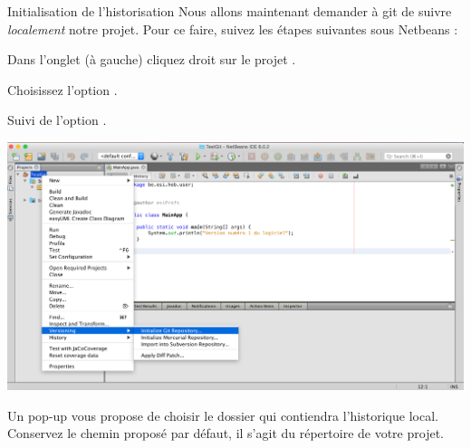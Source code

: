 \documentclass[a4paper,11pt]{style-esi/td}
\begin{document}
\begin{Tutoriel}{Initialisation de l'historisation}
	Nous allons maintenant demander à git de suivre \emph{localement} notre projet.
	Pour ce faire, suivez les étapes suivantes sous Netbeans :
	\begin{steps}
	\item
		Dans l'onglet  (à gauche) 
		cliquez droit sur le projet .
	\item 
		Choisissez l'option .
	\item 
		Suivi de l'option .
		\begin{center}
			\includegraphics[width=.8\textwidth]{image/NetBeans_Push01.png}
		\end{center}
	\item 
		Un pop-up vous propose de choisir le dossier 
		qui contiendra l'historique local.
		Conservez le chemin proposé par défaut, 
		il s'agit du répertoire de votre projet.
	\end{steps}
\end{Tutoriel}
\end{document}
